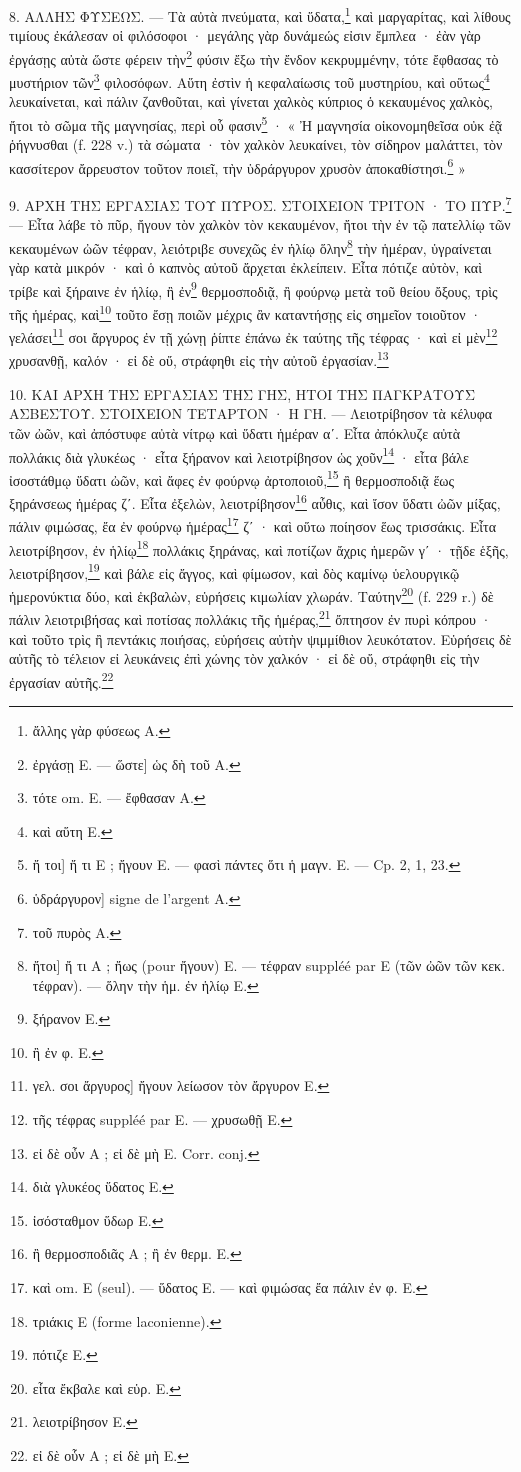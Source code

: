 \documentclass[a4paper, 11pt, oneside, polutonikogreek, french]{article}
\begin{document}
8. ΑΛΛΗΣ ΦΥΣΕΩΣ. --- Τὰ αὐτὰ πνεύματα, καὶ ὕδατα,\footnote{ἄλλης γὰρ φύσεως A.} καὶ μαργαρίτας, καὶ λίθους τιμίους ἐκάλεσαν οἱ φιλόσοφοι · μεγάλης γὰρ δυνάμεώς εἰσιν ἔμπλεα · ἐὰν γὰρ ἐργάσῃς αὐτὰ ὥστε φέρειν τὴν\footnote{ἐργάσῃ E. --- ὥστε] ὡς δὴ τοῦ A.} φύσιν ἔξω τὴν ἔνδον κεκρυμμένην, τότε ἔφθασας τὸ μυστήριον τῶν\footnote{τότε om. E. --- ἔφθασαν A.} φιλοσόφων. Αὕτη ἐστὶν ἡ κεφαλαίωσις τοῦ μυστηρίου, καὶ οὕτως\footnote{καὶ αὕτη E.} λευκαίνεται, καὶ πάλιν ζανθοῦται, καὶ γίνεται χαλκὸς κύπριος ὁ κεκαυμένος χαλκὸς, ἤτοι τὸ σῶμα τῆς μαγνησίας, περὶ οὗ φασιν\footnote{ἤ τοι] ἤ τι E ; ἤγουν E. --- φασὶ πάντες ὅτι ἡ μαγν. E. --- Cp. 2, 1, 23.} · « Ἠ μαγνησία οἰκονομηθεῖσα οὐκ ἐᾷ ῥήγνυσθαι (f. 228 v.) τὰ σώματα · τὸν χαλκὸν λευκαίνει, τὸν σίδηρον μαλάττει, τὸν κασσίτερον ἄρρευστον τοῦτον ποιεῖ, τὴν ὑδράργυρον χρυσὸν ἀποκαθίστησι.\footnote{ὑδράργυρον] signe de l'argent A.} »

9. ΑΡΧΗ ΤΗΣ ΕΡΓΑΣΙΑΣ ΤΟΥ ΠΥΡΟΣ. ΣΤΟΙΧΕΙΟΝ ΤΡΙΤΟΝ · ΤΟ ΠΥΡ.\footnote{τοῦ πυρὸς A.} --- Εἶτα λάβε τὸ πῦρ, ἤγουν τὸν χαλκὸν τὸν κεκαυμένον, ἤτοι τὴν ἐν τῷ πατελλίῳ τῶν κεκαυμένων ὠῶν τέφραν, λειότριβε συνεχῶς ἐν ἡλίῳ ὅλην\footnote{ἤτοι] ἤ τι A ; ἤως (pour ἤγουν) E. --- τέφραν suppléé par E (τῶν ὠῶν τῶν κεκ. τέφραν). --- ὅλην τὴν ἡμ. ἐν ἡλίῳ E.} τὴν ἡμέραν, ὑγραίνεται γὰρ κατὰ μικρόν · καὶ ὁ καπνὸς αὐτοῦ ἄρχεται ἐκλείπειν. Εἶτα πότιζε αὐτὸν, καὶ τρίβε καὶ ξήραινε ἐν ἡλίῳ, ἢ ἐν\footnote{ξήρανον E.} θερμοσποδιᾷ, ἢ φούρνῳ μετὰ τοῦ θείου ὄξους, τρὶς τῆς ἡμέρας, καὶ\footnote{ἢ ἐν φ. E.} τοῦτο ἔσῃ ποιῶν μέχρις ἂν καταντήσῃς εἰς σημεῖον τοιοῦτον · γελάσει\footnote{γελ. σοι ἄργυρος] ἤγουν λείωσον τὸν ἄργυρον E.} σοι ἄργυρος ἐν τῇ χώνῃ ῥίπτε ἐπάνω ἐκ ταύτης τῆς τέφρας · καὶ εἰ μὲν\footnote{τῆς τέφρας suppléé par E. --- χρυσωθῇ E.} χρυσανθῇ, καλόν · εἰ δὲ οὔ, στράφηθι εἰς τὴν αὐτοῦ ἐργασίαν.\footnote{εἰ δὲ οὖν A ; εἰ δὲ μὴ E. Corr. conj.}

10. ΚΑΙ ΑΡΧΗ ΤΗΣ ΕΡΓΑΣΙΑΣ ΤΗΣ ΓΗΣ, ΗΤΟΙ ΤΗΣ ΠΑΓΚΡΑΤΟΥΣ ΑΣΒΕΣΤΟΥ. ΣΤΟΙΧΕΙΟΝ ΤΕΤΑΡΤΟΝ · Η ΓΗ. --- Λειοτρίβησον τὰ κέλυφα τῶν ὠῶν, καὶ ἀπόστυφε αὐτὰ νίτρῳ καὶ ὕδατι ἡμέραν αʹ. Εἶτα ἀπόκλυζε αὐτὰ πολλάκις διὰ γλυκέως · εἶτα ξήρανον καὶ λειοτρίβησον ὡς χοῦν\footnote{διὰ γλυκέος ὕδατος E.} · εἶτα βάλε ἰσοστάθμῳ ὕδατι ὠῶν, καὶ ἄφες ἐν φούρνῳ ἀρτοποιοῦ,\footnote{ἰσόσταθμον ὕδωρ E.} ἢ θερμοσποδιᾷ ἕως ξηράνσεως ἡμέρας ζʹ. Εἶτα ἐξελὼν, λειοτρίβησον\footnote{ἢ θερμοσποδιᾶς A ; ἢ ἐν θερμ. E.} αὖθις, καὶ ἴσον ὕδατι ὠῶν μίξας, πάλιν φιμώσας, ἔα ἐν φούρνῳ ἡμέρας\footnote{καὶ om. E (seul). --- ὕδατος E. --- καὶ φιμώσας ἔα πάλιν ἐν φ. E.} ζʹ · καὶ οὕτω ποίησον ἕως τρισσάκις. Εἶτα λειοτρίβησον, ἐν ἡλίῳ\footnote{τριάκις E (forme laconienne).} πολλάκις ξηράνας, καὶ ποτίζων ἄχρις ἡμερῶν γʹ · τῇδε ἑξῆς, λειοτρίβησον,\footnote{πότιζε E.} καὶ βάλε εἰς ἄγγος, καὶ φίμωσον, καὶ δὸς καμίνῳ ὑελουργικῷ ἡμερονύκτια δύο, καὶ ἐκβαλὼν, εὑρήσεις κιμωλίαν χλωράν. Ταύτην\footnote{εἶτα ἔκβαλε καὶ εὑρ. E.} (f. 229 r.) δὲ πάλιν λειοτριβήσας καὶ ποτίσας πολλάκις τῆς ἡμέρας,\footnote{λειοτρίβησον E.} ὄπτησον ἐν πυρὶ κόπρου · καὶ τοῦτο τρὶς ἢ πεντάκις ποιήσας, εὑρήσεις αὐτὴν ψιμμίθιον λευκότατον. Εὑρήσεις δὲ αὐτῆς τὸ τέλειον εἰ λευκάνεις ἐπὶ χώνης τὸν χαλκόν · εἰ δὲ οὔ, στράφηθι εἰς τὴν ἐργασίαν αὐτῆς.\footnote{εἰ δὲ οὗν A ; εἰ δὲ μὴ E.}
\end{document}
